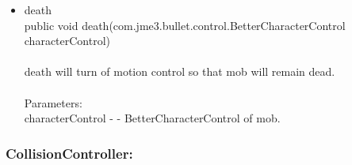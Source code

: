 \documentclass[letterpaper]{article}
\begin{document}
\begin{itemize}
\begin{itemize}
											\item	death \\
													public void death(com.jme3.bullet.control.BetterCharacterControl characterControl) \\ \\
													death will turn of motion control so that mob will remain dead. \\ \\
													Parameters: \\
													characterControl - - BetterCharacterControl of mob. \\
										\end{itemize}
							\end{itemize}
							
							\vspace{0.2in}
							\subsubsection*{CollisionController:}
							\vspace{0.1in}	
\end{document}
